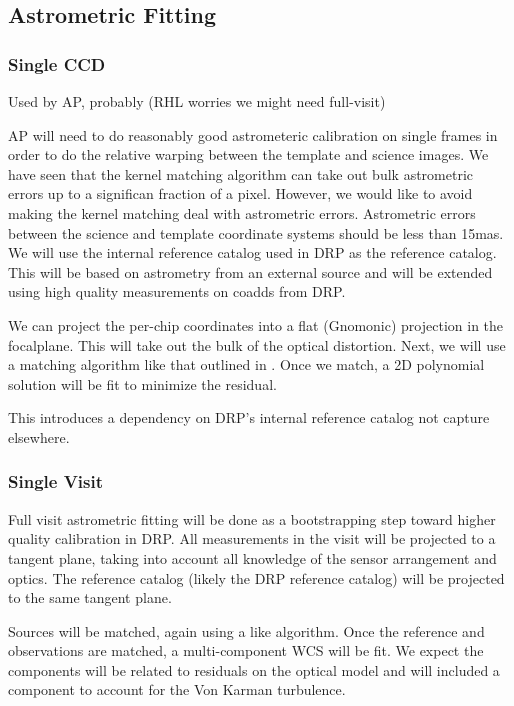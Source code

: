 \subsection{Astrometric Fitting}
\label{sec:acAstrometricFitting}
\subsubsection{Single CCD}
\label{sec:acSingleCCDAstrometricFit}
Used by AP, probably (RHL worries we might need full-visit)

AP will need to do reasonably good astrometeric calibration on single frames in order to do the relative warping between the template and science images.  We have seen that the kernel matching algorithm can take out bulk astrometric errors up to a significan fraction of a pixel.  However, we would like to avoid making the kernel matching deal with astrometric errors.  Astrometric errors between the science and template coordinate systems should be less than 15mas.  We will use the internal reference catalog used in DRP as the reference catalog.  This will be based on astrometry from an external source and will be extended using high quality measurements on coadds from DRP.

We can project the per-chip coordinates into a flat (Gnomonic) projection in the focalplane.  This will take out the bulk of the optical distortion.  Next, we will use a matching algorithm like that outlined in \cite{tabur04}.  Once we match, a 2D polynomial solution will be fit to minimize the residual.

\begin{note}[Dependency]
This introduces a dependency on DRP's internal reference catalog not capture elsewhere.
\end{note}

\subsubsection{Single Visit}
\label{sec:acSingleVisitAstrometricFit}
Full visit astrometric fitting will be done as a bootstrapping step toward higher quality calibration in DRP.  All measurements in the visit will be projected to a tangent plane, taking into account all knowledge of the sensor arrangement and optics.  The reference catalog (likely the DRP reference catalog) will be projected to the same tangent plane.

Sources will be matched, again using a \cite{tabor04} like algorithm.  Once the reference and observations are matched, a multi-component WCS will be fit.  We expect the components will be related to residuals on the optical model and will included a component to account for the Von Karman turbulence.

